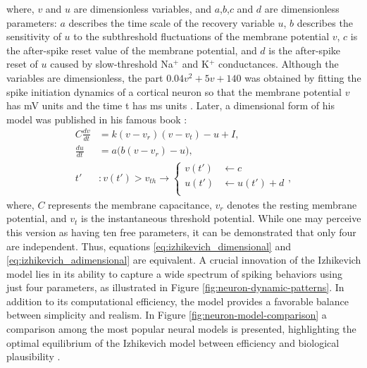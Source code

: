 \documentclass[../main.tex]{subfiles}
\begin{document}
where, $v$ and $u$ are dimensionless variables, and $a$,$b$,$c$ and $d$ are dimensionless parameters: $a$ describes the time scale of the recovery variable $u$, $b$ describes the sensitivity of $u$ to the subthreshold fluctuations of the membrane potential $v$, $c$ is the after-spike reset value of the membrane potential, and $d$ is the after-spike reset of $u$ caused by slow-threshold Na$^{+}$ and K$^+$ conductances.
Although the variables are dimensionless, the part $0.04v^2+5v+140$ was obtained by fitting the spike initiation dynamics of a cortical neuron so that the
membrane potential $v$ has mV units and the time t has ms units \citep{izhikevich_simple_2003}.
Later, a dimensional form of his model was published in his famous book \citep{izhikevich_dynamical_2007}:
\begin{equation}
    \begin{aligned}
        C\displaystyle\frac{dv}{dt} &= k(v-v_r)(v-v_t) -u + I, \\
        \displaystyle\frac{du}{dt} &= a\big( b(v-v_r)- u\big), \\
        t' &: v(t') > v_{th} \rightarrow
        \begin{cases}
            v(t') &\leftarrow c\\
            u(t') & \leftarrow u(t') + d\\
        \end{cases},
    \end{aligned}
    \label{eq:izhikevich_dimensional}
\end{equation}
where, $C$ represents the membrane capacitance, $v_r$ denotes the resting membrane potential, and $v_t$ is the instantaneous threshold potential.
While one may perceive this version as having ten free parameters, it can be demonstrated that only four are independent.
Thus, equations \eqref{eq:izhikevich_dimensional} and \eqref{eq:izhikevich_adimensional} are equivalent.
\clearpage
A crucial innovation of the Izhikevich model lies in its ability to capture a wide spectrum of spiking behaviors using just four parameters, as illustrated in Figure \ref{fig:neuron-dynamic-patterns}.
In addition to its computational efficiency, the model provides a favorable balance between simplicity and realism.
In Figure \ref{fig:neuron-model-comparison} a comparison among the most popular neural models is presented, highlighting the optimal equilibrium of the Izhikevich model between efficiency and biological plausibility \citep{izhikevich_dynamical_2007}.
\end{document}
